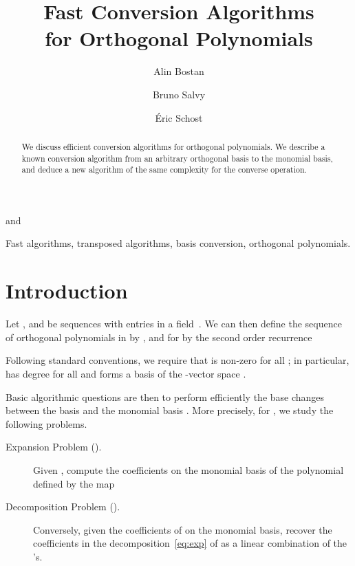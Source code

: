 \documentclass{elsart}
\begin{document}
\begin{frontmatter}
\title{Fast Conversion Algorithms \\ for Orthogonal Polynomials}
\author{Alin Bostan} 
 \qquad
\author{Bruno Salvy} 
\address{Algorithms Project, INRIA Rocquencourt \\ 78153 Le Chesnay Cedex France} \medskip
and
\author{{\'E}ric Schost} 
\address{ORCCA and Computer Science Department, Middlesex College, \\
University of Western Ontario, London, Canada}


\begin{abstract}
We discuss efficient conversion algorithms for orthogonal polynomials. We describe a known 
conversion algorithm from an arbitrary orthogonal basis to the monomial basis,
and deduce a new algorithm of the same complexity for the converse operation.
\end{abstract}


\begin{keyword}
Fast algorithms, transposed algorithms, basis conversion, orthogonal polynomials.
\end{keyword}


\maketitle 
\end{frontmatter}



\section{Introduction}

Let ,  and  be
sequences with entries in a field~. We can then define the
sequence  of orthogonal polynomials in  by
,  and for  by the second order
recurrence

Following standard conventions, we require that  is non-zero
for all ; in particular,  has degree  for all  and  forms a basis of the -vector space
.

Basic algorithmic questions are then to perform efficiently the base
changes between the basis  and the monomial basis
. More precisely, for , we study the following problems.

\medskip
\begin{description}
\item[Expansion Problem ().] Given , compute the coefficients on the monomial basis of the
polynomial  defined by the map
 
\item[Decomposition Problem ().] Conversely, given the
coefficients of  on the monomial basis, recover the coefficients
 in the decomposition~\eqref{eq:exp} of
 as a linear combination of the 's.
\end{description}
\end{document}
